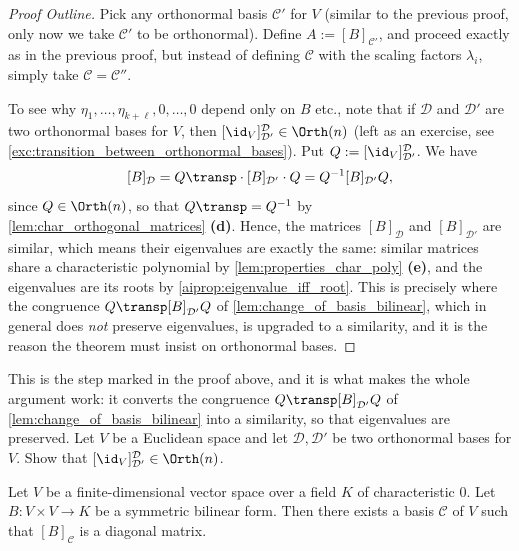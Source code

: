 \begin{proof}[Proof Outline]
Pick any orthonormal basis $\mathcal{C}'$ for $V$ (similar to the previous proof, only now we take $\mathcal{C}'$ to be orthonormal). Define $A := [B]_{\mathcal{C}'}$, and proceed exactly as in the previous proof, but instead of defining $\mathcal{C}$ with the scaling factors $\lambda_i$, simply take $\mathcal{C} = \mathcal{C}''$.

To see why $\eta_1, \dots, \eta_{k+\ell}, 0, \dots, 0$ depend only on $B$ etc., note that if $\mathcal{D}$ and $\mathcal{D}'$ are two orthonormal bases for $V$, then $[\id_V]_{\mathcal{D}'}^{\mathcal{D}} \in \Orth(n)$ (left as an exercise, see \cref{exc:transition_between_orthonormal_bases}). Put $Q := [\id_V]_{\mathcal{D}'}^{\mathcal{D}}$.
We have
\[
[B]_{\mathcal{D}} = Q\transp \cdot [B]_{\mathcal{D}'} \cdot Q = Q^{-1} [B]_{\mathcal{D}'} Q,
\]
since $Q \in \Orth(n)$, so that $Q\transp = Q^{-1}$ by \cref{lem:char_orthogonal_matrices} \textbf{(d)}. Hence, the matrices $[B]_{\mathcal{D}}$ and $[B]_{\mathcal{D}'}$ are similar, which means their eigenvalues are exactly the same: similar matrices share a characteristic polynomial by \cref{lem:properties_char_poly} \textbf{(e)}, and the eigenvalues are its roots by \cref{aiprop:eigenvalue_iff_root}. This is precisely where the congruence $Q\transp [B]_{\mathcal{D}'} Q$ of \cref{lem:change_of_basis_bilinear}, which in general does \emph{not} preserve eigenvalues, is upgraded to a similarity, and it is the reason the theorem must insist on orthonormal bases.
\end{proof}

\begin{exercise}
\label{exc:transition_between_orthonormal_bases}
This is the step marked  in the proof above, and it is what makes the whole argument work: it converts the congruence $Q\transp [B]_{\mathcal{D}'} Q$ of \cref{lem:change_of_basis_bilinear} into a similarity, so that eigenvalues are preserved. Let $V$ be a Euclidean space and let $\mathcal{D}, \mathcal{D}'$ be two orthonormal bases for $V$. Show that $[\id_V]_{\mathcal{D}'}^{\mathcal{D}} \in \Orth(n)$.
\end{exercise}

\begin{theorem}
\label{thm:diagonalization_symmetric_bilinear}
Let $V$ be a finite-di\-men\-sional vector space over a field $K$ of characteristic $0$. Let $B \colon V \times V \to K$ be a symmetric bilinear form. Then there exists a basis $\mathcal{C}$ of $V$ such that $[B]_{\mathcal{C}}$ is a diagonal matrix.
\end{theorem}


